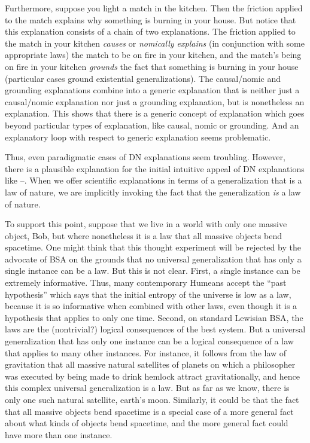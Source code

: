 Furthermore, suppose you light a match in the kitchen. Then the friction applied to the match explains why something is burning in 
your house. But notice that this explanation consists of a chain of two explanations. The friction applied to the match in your 
kitchen \textit{causes} or \textit{nomically explains} (in conjunction with some appropriate laws) the match to be on fire in your kitchen, and the match's being on fire in your kitchen \textit{grounds} the 
fact that something is burning in your house (particular cases ground existential generalizations). The causal/nomic and grounding explanations
combine into a generic explanation that is neither just a causal/nomic explanation nor just a grounding explanation, but is nonetheless an 
explanation. This shows that there is a generic concept of explanation which goes beyond particular types of explanation, like 
causal, nomic or grounding. And an explanatory loop with respect to generic explanation seems problematic.

Thus, even paradigmatic cases of DN explanations seem troubling. However, there is a plausible explanation for the initial intuitive 
appeal of DN explanations like --. When we offer scientific explanations in terms of a generalization that is a 
law of nature, we are implicitly invoking the fact that the generalization \textit{is} a law of nature. 

To support this point, suppose that we live in a world with only one massive object, Bob, but where nonetheless it is a law that all massive objects
bend spacetime. One might think that this thought experiment will be rejected by the advocate of BSA on the grounds that no 
universal generalization that has only a single instance can be a law. But this is not clear. First, a single instance can be
extremely informative. Thus, many contemporary Humeans accept the ``past hypothesis'' which says that the initial entropy of the
universe is low as a law, because it is so informative when combined with other laws, even though it is a hypothesis that applies
to only one time. Second, on standard Lewisian BSA, the laws are the (nontrivial?) logical consequences of the best system. But a universal 
generalization that has only one instance can be a logical consequence of a law that applies to many other instances. For instance,
it follows from the law of gravitation that all massive natural satellites of planets on which a philosopher was executed by being
made to drink hemlock attract gravitationally, and hence this complex universal generalization is a law. But as far as we know, 
there is only one such natural satellite, earth's moon. Similarly, it could be that the fact that all massive objects bend spacetime 
is a special case of a more general fact about what kinds of objects bend spacetime, and the more general fact could have
more than one instance. 

